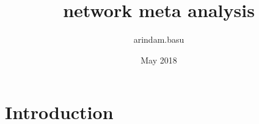 \documentclass{article}
\title{network meta analysis}
\author{arindam.basu }
\date{May 2018}
\begin{document}
\maketitle

\section{Introduction}
\end{document}
